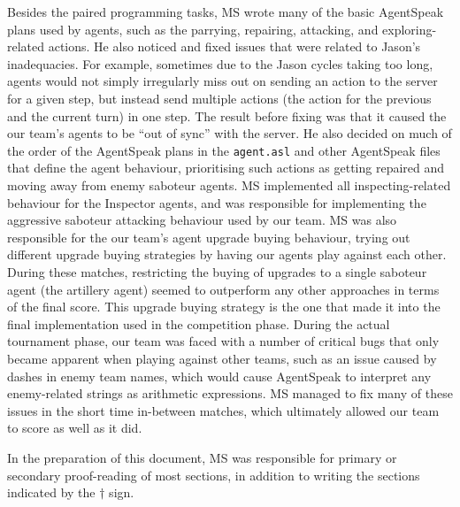 Besides the paired programming tasks, MS wrote many of the basic AgentSpeak plans used by agents, such as the parrying, repairing, attacking, and exploring-related actions.
He also noticed and fixed issues that were related to Jason's inadequacies.
For example, sometimes due to the Jason cycles taking too long, agents would not simply irregularly miss out on sending an action to the server for a given step, but instead send multiple actions (the action for the previous and the current turn) in one step.
The result before fixing was that it caused the our team's agents to be \enquote{out of sync} with the server.
He also decided on much of the order of the AgentSpeak plans in the \texttt{agent.asl} and other AgentSpeak files that define the agent behaviour, prioritising such actions as getting repaired and moving away from enemy saboteur agents.
MS implemented all inspecting-related behaviour for the Inspector agents, and was responsible for implementing the aggressive saboteur attacking behaviour used by our team.
MS was also responsible for the our team's agent upgrade buying behaviour, trying out different upgrade buying strategies by having our agents play against each other.
During these matches, restricting the buying of upgrades to a single saboteur agent (the artillery agent) seemed to outperform any other approaches in terms of the final score.
This upgrade buying strategy is the one that made it into the final implementation used in the competition phase.
During the actual tournament phase, our team was faced with a number of critical bugs that only became apparent when playing against other teams, such as an issue caused by dashes in enemy team names, which would cause AgentSpeak to interpret any enemy-related strings as arithmetic expressions.
MS managed to fix many of these issues in the short time in-between matches, which ultimately allowed our team to score as well as it did.

In the preparation of this document, MS was responsible for primary or secondary proof-reading of most sections, in addition to writing the sections indicated by the $\dagger$ sign.

